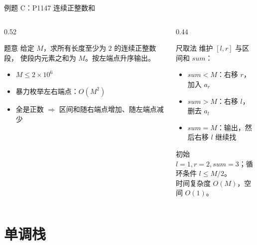 \documentclass[aspectratio=169]{beamer}
\begin{document}
\begin{frame}{例题 C：P1147 连续正整数和}
    \begin{columns}[T]
        \begin{column}{0.52\textwidth}
            \small
            \begin{block}{题意}
                \footnotesize
                给定 $M$，求所有长度至少为 $2$ 的连续正整数段，
                使段内元素之和为 $M$。按左端点升序输出。
            \end{block}
            \begin{itemize}
                \item $M\le 2\times10^6$
                \item 暴力枚举左右端点：$O(M^2)$
                \item 全是正数 $\Rightarrow$ 区间和随右端点增加、随左端点减少
            \end{itemize}
        \end{column}
        \begin{column}{0.44\textwidth}
            \begin{block}{尺取法}
                \footnotesize
                维护 $[l,r]$ 与区间和 $sum$：
                \begin{itemize}
                    \item $sum<M$：右移 $r$，加入 $a_r$
                    \item $sum>M$：右移 $l$，删去 $a_l$
                    \item $sum=M$：输出，然后右移 $l$ 继续找
                \end{itemize}
            \end{block}
            \vspace{0.4em}
            \footnotesize
            初始 $l=1,r=2,sum=3$；循环条件 $l\le M/2$。\\
            时间复杂度 $O(M)$，空间 $O(1)$。
        \end{column}
    \end{columns}
\end{frame}

\section{单调栈}
\end{document}
